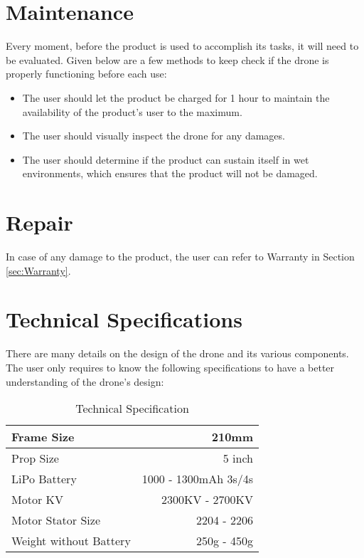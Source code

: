 \documentclass[12pt]{article}
\begin{document}
\section{Maintenance}

Every moment, before the product is used to accomplish its tasks, it will need to be evaluated. Given below are a few methods to keep check if the drone is properly functioning before each use:

\begin{itemize}
    \item The user should let the product be charged for 1 hour to maintain the availability of the product's user to the maximum.
    \item The user should visually inspect the drone for any damages.
    \item The user should determine if the product can sustain itself in wet environments, which ensures that the product will not be damaged.
\end{itemize}

\section{Repair}

In case of any damage to the product, the user can refer to Warranty in Section \ref{sec:Warranty}.

\section{Technical Specifications}

There are many details on the design of the drone and its various components. The user only requires to know the following specifications to have a better understanding of the drone's design:

\begin{longtable}{| l | r |}
\caption {Technical Specification}
\label{tab:TechnicalSpecifications} \\
\hline
Frame Size & 210mm \\
\hline
Prop Size & 5 inch \\
\hline
LiPo Battery & 1000 - 1300mAh 3s/4s \\
\hline
Motor KV & 2300KV - 2700KV \\
\hline
Motor Stator Size & 2204 - 2206 \\
\hline
Weight without Battery & 250g - 450g \\
\hline
\end{longtable}
\end{document}
